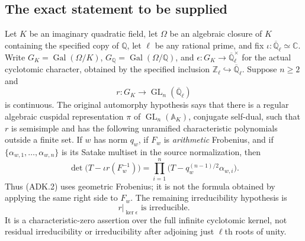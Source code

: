 \documentclass[11pt,a4paper]{article}
\numberwithin{equation}{section}
\theoremstyle{remark}\newtheorem{remark}[theorem]{Remark}
\begin{document}
\subsection{The exact statement to be supplied}

Let $K$ be an imaginary quadratic field, let $\Omega$ be an algebraic
closure of $K$ containing the specified copy of $\mathbb Q$, let $\ell$
be any rational prime, and fix
$\iota:\overline{\mathbb Q}_{\ell}\simeq\mathbb C$.
Write $G_K=\operatorname{Gal}(\Omega/K)$,
$G_{\mathbb Q}=\operatorname{Gal}(\Omega/\mathbb Q)$, and
$\epsilon:G_K\to\overline{\mathbb Q}_{\ell}^{\times}$ for the actual
cyclotomic character, obtained by the specified inclusion
$\mathbb Z_\ell\hookrightarrow\overline{\mathbb Q}_\ell$.
Suppose $n\ge2$ and
\[
 r:G_K\longrightarrow\operatorname{GL}_n(\overline{\mathbb Q}_\ell)
 \tag{ADK.1}
\]
is continuous.  The original automorphy hypothesis says that there is
a regular algebraic cuspidal representation $\pi$ of
$\operatorname{GL}_n(\mathbb A_K)$, conjugate self-dual, such that $r$
is semisimple and has the following unramified characteristic
polynomials outside a finite set.  If $w$ has norm $q_w$, if $F_w$ is
\emph{arithmetic} Frobenius, and if
$\{\alpha_{w,1},\ldots,\alpha_{w,\allowbreak{} n}\}$ is its Satake multiset in the
source normalization, then
\[
 \det\bigl(T-\iota r(F_w^{-1})\bigr)
 =\prod_{i=1}^{n}
   \bigl(T-q_w^{(n-1)/2}\alpha_{w,\allowbreak{} i}\bigr).
 \tag{ADK.2}
\]
Thus (ADK.2) uses geometric Frobenius; it is not the formula obtained
by applying the same right side to $F_w$.
The remaining irreducibility hypothesis is
\[
                       r|_{\ker\epsilon}\text{ is irreducible}.
 \tag{ADK.3}
\]
It is a characteristic-zero assertion over the full infinite
cyclotomic kernel, not residual irreducibility or irreducibility after
adjoining just $\ell$th roots of unity.
\end{document}
